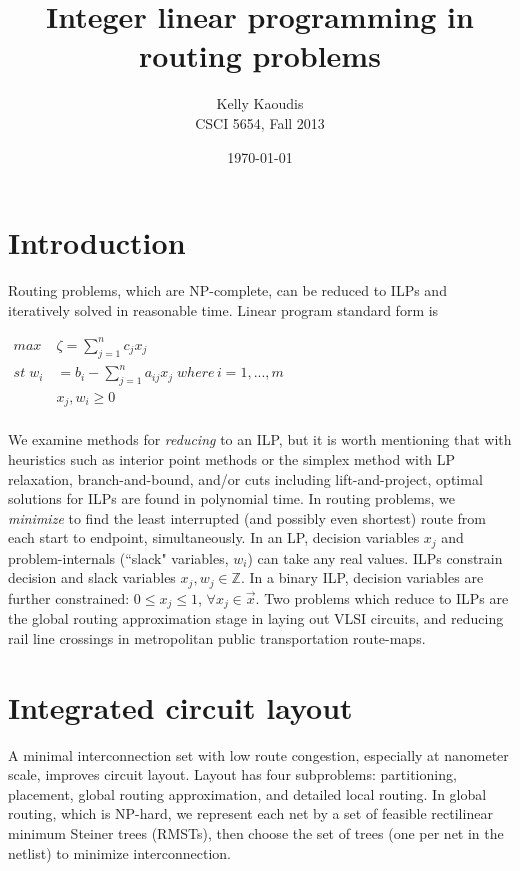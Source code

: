 \documentclass[twocolumn]{article}
\title{Integer linear programming in routing problems}
\author{
    Kelly Kaoudis \\
    CSCI 5654, Fall 2013 \\
}
\date{\today}
\begin{document}
\maketitle

\section*{Introduction}

Routing problems, which are NP-complete, can be reduced to ILPs and iteratively solved in reasonable time.
Linear program standard form\cite{Vanderbei} is

$
\begin{aligned}
    max \; & \zeta = {\sum\limits^{n}_{j=1}c_j x_j} \\
    st \; w_i & = b_i - {\sum\limits^{n}_{j=1}a_{ij} x_j} \; where \, i = {1, ..., m} \\
          & x_j, w_i \geq 0 \\
\end{aligned}
$

We examine methods for \textit{reducing} to an ILP, but it
is worth mentioning that with heuristics such as interior point methods or the simplex method with
LP relaxation, branch-and-bound, and/or cuts including lift-and-project, optimal solutions for ILPs
are found in polynomial time. In routing problems, we \textit{minimize} to find the least interrupted
(and possibly even shortest) route from each start to endpoint, simultaneously. In an LP,
decision variables $x_j$ and problem-internals (``slack" variables, $ w_i $) can take any real values.
ILPs constrain decision and slack variables $x_j, w_j \in \mathbb{Z}$. In a binary ILP, decision variables
are further constrained: $0 \leq x_j \leq 1$, $\forall x_j \in \vec{x}$. Two problems which reduce to ILPs are the global routing approximation stage in laying out VLSI circuits,
and reducing rail line crossings in metropolitan public transportation route-maps.

\section*{Integrated circuit layout}

A minimal interconnection set with low route congestion, especially at nanometer scale, improves
circuit layout\cite{wu}.
Layout has four subproblems: partitioning, placement, global routing
approximation, and detailed local routing. In global routing, which is NP-hard, we
represent each net by a set of feasible rectilinear minimum Steiner trees (RMSTs),
then choose the set of trees (one per net in the netlist) to minimize interconnection.
\end{document}
